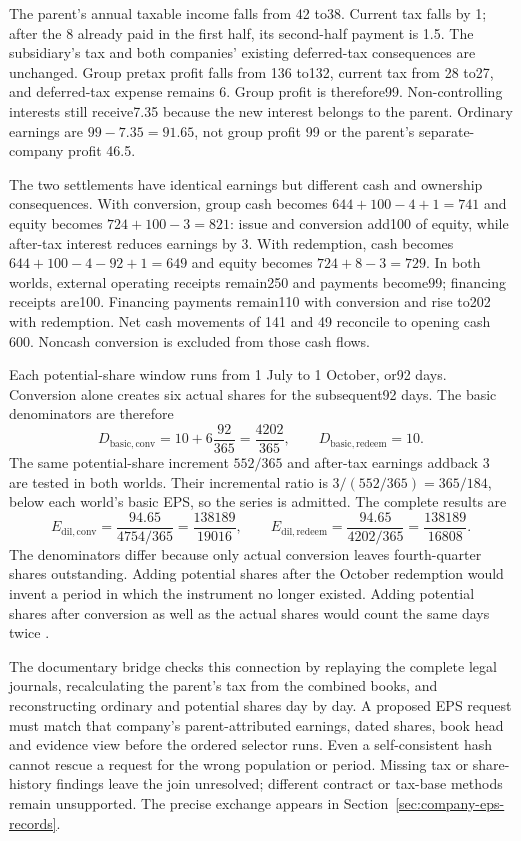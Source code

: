 The parent's annual taxable income falls from 42 to38. Current tax falls by 1;
after the 8 already paid in the first half, its second-half payment is 1.5.
The subsidiary's tax and both companies' existing deferred-tax consequences
are unchanged. Group pretax profit falls from 136 to132, current tax from 28
to27, and deferred-tax expense remains 6. Group profit is therefore99.
Non-controlling interests still receive7.35 because the new interest belongs
to the parent. Ordinary earnings are $99-7.35=91.65$, not group profit 99
or the parent's separate-company profit 46.5.

The two settlements have identical earnings but different cash and ownership
consequences. With conversion, group cash becomes $644+100-4+1=741$ and equity
becomes $724+100-3=821$: issue and conversion add100 of equity, while after-tax
interest reduces earnings by 3. With redemption, cash becomes
$644+100-4-92+1=649$ and equity becomes $724+8-3=729$.
In both worlds, external operating receipts remain250 and payments become99;
financing receipts are100. Financing payments remain110 with conversion and
rise to202 with redemption. Net cash movements of 141 and 49 reconcile to
opening cash 600. Noncash conversion is excluded from those cash flows.

Each potential-share window runs from 1 July to 1 October, or92 days.
Conversion alone creates six actual shares for the subsequent92 days.
The basic denominators are therefore
\[
 D_{\mathrm{basic,conv}}=10+6\frac{92}{365}=\frac{4202}{365},
 \qquad D_{\mathrm{basic,redeem}}=10.
\]
The same potential-share increment $552/365$ and after-tax earnings addback 3
are tested in both worlds. Their incremental ratio is
$3/(552/365)=365/184$, below each world's basic EPS, so the series is admitted.
The complete results are
\[
 E_{\mathrm{dil,conv}}=\frac{94.65}{4754/365}
     =\frac{138189}{19016},\qquad
 E_{\mathrm{dil,redeem}}=\frac{94.65}{4202/365}
     =\frac{138189}{16808}.
\]
The denominators differ because only actual conversion leaves fourth-quarter
shares outstanding. Adding potential shares after the October redemption
would invent a period in which the instrument no longer existed. Adding
potential shares after conversion as well as the actual shares would count
the same days twice \citep[IAS~33, paragraphs 21(c), 33--38]{eu20231803}.

The documentary  bridge checks this connection by
replaying the complete legal journals, recalculating the parent's tax from
the combined books, and reconstructing ordinary and potential shares day by
day. A proposed EPS request must match that company's parent-attributed
earnings, dated shares, book head and evidence view before the ordered selector
runs. Even a self-consistent hash cannot rescue a request for the wrong
population or period. Missing tax or share-history findings leave the join
unresolved; different contract or tax-base methods remain unsupported.
The precise exchange appears in Section~\ref{sec:company-eps-records}.
